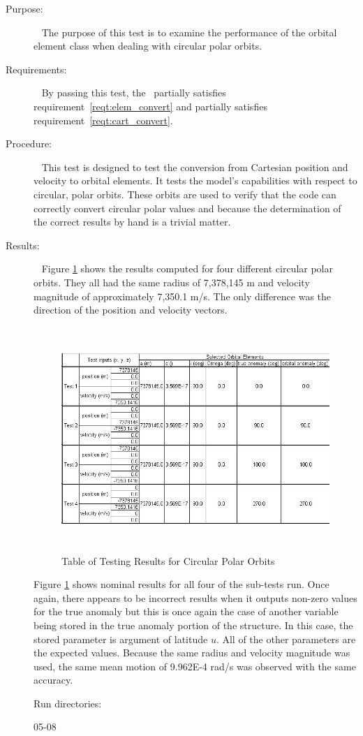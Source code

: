 \label{test:circ_pol_per}
\begin{description}
\item[Purpose:] \ \newline
The purpose of this test is to examine the performance of the orbital element
class when dealing with circular polar orbits.
\item[Requirements:] \ \newline
By passing this test, the \OrbitalElement\ partially satisfies
requirement~\ref{reqt:elem_convert} and partially satisfies
requirement~\ref{reqt:cart_convert}.
\item[Procedure:]\ \newline
This test is designed to test the conversion from Cartesian position and
velocity to orbital elements.  It tests the model's capabilities with respect
to circular, polar orbits.  These orbits are used to verify that the
code can correctly convert circular polar values and because the
determination of the correct results by hand is a trivial matter.
\item[Results:]\ \newline
Figure \ref{cir_eq_90} shows the results computed for four different circular
polar orbits.  They all had the same radius of 7,378,145 m and velocity
magnitude of approximately 7,350.1 m/s.  The only difference was the
direction of the position and velocity vectors.
\begin{figure}[h]
\begin{center}
\includegraphics[height=85mm]{JPGfiles/circ_in_90.jpg}
\caption{Table of Testing Results for Circular Polar Orbits}
\label{cir_eq_90}
\end{center}
\end{figure}

Figure \ref{cir_eq_90} shows nominal results for all four of the sub-tests run.
Once again, there appears to be incorrect results when it outputs non-zero
values for the true anomaly but this is once again the case of another variable
being stored in the true anomaly portion of the structure.  In this case, the
stored parameter is argument of latitude $u$.  All of the other parameters are
the expected values.  Because the same radius and velocity magnitude was used,
the same mean motion of 9.962E-4 rad/s was observed with the same accuracy.

Run directories:

05-08
\end{description}

